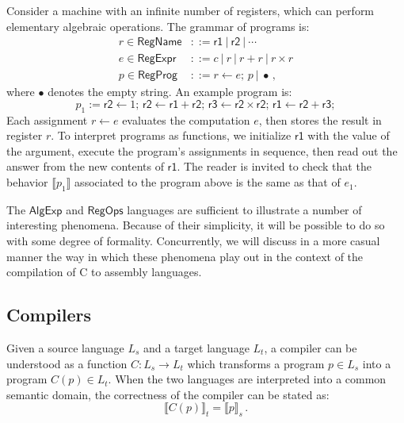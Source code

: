 \documentclass[sigplan,10pt,review,anonymous]{acmart}
\newcommand{\kw}[1]{\ensuremath{ \textsf{#1} }}
\begin{document}
\begin{example}[$\kw{RegProg}$] %
Consider a machine with an infinite number of registers,
which can perform elementary algebraic operations.
The grammar of programs is:
\begin{align*}
  r \in \kw{RegName} &::= \kw{r1} \:|\: \kw{r2} \:|\: \cdots \\
  e \in \kw{RegExpr} &::= c \:|\: r \:|\: r + r \:|\: r \times r \\
  p \in \kw{RegProg} &::= r \leftarrow e; \, p \:|\: \bullet \,,
\end{align*}
where $\bullet$ denotes the empty string.
An example program is:
\[
  p_1 :=
  \kw{r2} \leftarrow 1; \,
  \kw{r2} \leftarrow \kw{r1} + \kw{r2}; \,
  \kw{r3} \leftarrow \kw{r2} \times \kw{r2}; \,
  \kw{r1} \leftarrow \kw{r2} + \kw{r3};
\]
Each assignment $r \leftarrow e$ evaluates the computation $e$,
then stores the result in register $r$.
To interpret programs as functions,
we initialize $\kw{r1}$ with the value of the argument,
execute the program's assignments in sequence,
then read out the answer from the new contents of $\kw{r1}$.
The reader is invited to check that
the behavior $\llbracket p_1 \rrbracket$ associated to the program above
is the same as that of $e_1$.
\end{example}

The $\kw{AlgExp}$ and $\kw{RegOps}$ languages
are sufficient to illustrate a number of interesting phenomena.
Because of their simplicity,
it will be possible to do so with some degree of formality.
Concurrently,
we will discuss in a more casual manner
the way in which these phenomena play out
in the context of the compilation of C to assembly languages.


\subsection{Compilers} %

Given a source language $L_s$
and a target language $L_t$,
a compiler can be understood as a function
$C : L_s \rightarrow L_t$
which transforms a program $p \in L_s$
into a program $C(p) \in L_t$.
When the two languages are interpreted into
a common semantic domain,
the correctness of the compiler can be stated as:
\[ \llbracket C(p) \rrbracket_t =
    \llbracket p \rrbracket_s \,. \]
\end{document}
